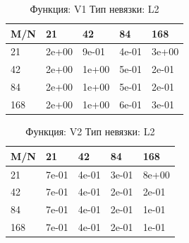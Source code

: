 \documentclass[a4paper,11pt]{article}
\begin{document}
\begin{table}[H]
\caption {Функция: V1 Тип невязки: L2  }
\begin{center}
\begin{tabular}{l|l|l|l|l}
\hline
M/N  & 21 & 42 & 84 & 168 \\ \hline
  21 & 2e+00& 9e-01& 4e-01& 3e+00\\ \hline
  42 & 2e+00& 1e+00& 5e-01& 2e-01\\ \hline
  84 & 2e+00& 1e+00& 5e-01& 2e-01\\ \hline
 168 & 2e+00& 1e+00& 6e-01& 3e-01\\ \hline
\end{tabular}
\end{center}
\end{table}
\begin{table}[H]
\caption {Функция: V2 Тип невязки: L2  }
\begin{center}
\begin{tabular}{l|l|l|l|l}
\hline
M/N  & 21 & 42 & 84 & 168 \\ \hline
  21 & 7e-01& 4e-01& 3e-01& 8e+00\\ \hline
  42 & 7e-01& 4e-01& 2e-01& 2e-01\\ \hline
  84 & 7e-01& 4e-01& 2e-01& 1e-01\\ \hline
 168 & 7e-01& 4e-01& 2e-01& 1e-01\\ \hline
\end{tabular}
\end{center}
\end{table}
\newpage
\end{document}
